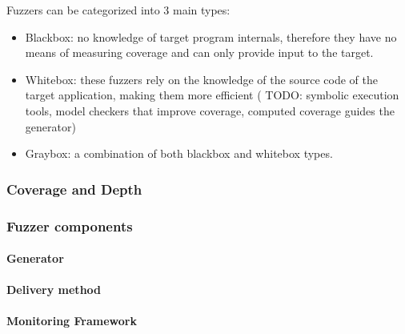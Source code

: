 Fuzzers can be categorized into 3 main types\cite{fetzer20}:

\begin{itemize}
    \item Blackbox: no knowledge of target program internals, therefore they have no means of measuring coverage and can only provide input to the target.
    \item Whitebox: these fuzzers rely on the knowledge of the source code of the target application, making them more efficient ( TODO: symbolic execution tools, model checkers that improve coverage, computed coverage guides the generator)
    \item Graybox: a combination of both blackbox and whitebox types.
\end{itemize}




\subsubsection{Coverage and Depth}

\subsubsection{Fuzzer components}

\paragraph{Generator}

\paragraph{Delivery method}

\paragraph{Monitoring Framework}
